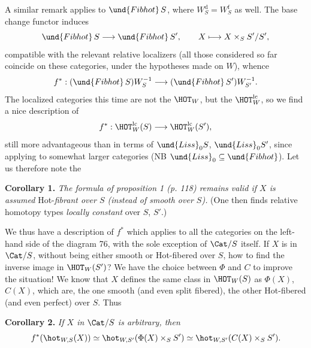 
A similar remark applies to $\und{Fibhot}\,S$, where $W_S^{\mathrm{d}} = W_S^{\mathrm{f}}$ as well. The base change functor induces
\[
\und{Fibhot}\,S \longrightarrow \und{Fibhot}\,S', \qquad X \longmapsto X \times_S S'/S',
\]
compatible with the relevant relative localizers (all those considered so far coincide on these categories, under the hypotheses made on $W$), whence
\[
f^* : (\und{Fibhot}\,S)W_S^{-1} \longrightarrow (\und{Fibhot}\,S')W_{S'}^{-1}.
\]
The localized categories this time are not the $\HOT_W$, but the $\HOT_W^{\mathrm{lc}}$, so we find a nice description of
\[
f^* : \HOT_W^{\mathrm{lc}}(S) \longrightarrow \HOT_W^{\mathrm{lc}}(S'),
\]
still more advantageous than in terms of $\und{Liss}_0S$, $\und{Liss}_0S'$, since applying to somewhat larger categories (NB $\und{Liss}_0 \subseteq \und{Fibhot}$). Let us therefore note the

\textbf{Corollary 1.} \textit{The formula of proposition 1 (p. 118) remains valid if $X$ is assumed} Hot-\textit{fibrant over $S$ (instead of smooth over $S$).} (One then finds relative homotopy types \textit{locally constant} over $S$, $S'$.)

We thus have a description of $f^*$ which applies to all the categories on the left-hand side
of the diagram 76, with the sole exception of $\Cat/S$ itself. If $X$ is in $\Cat/S$, without being either smooth or Hot-fibered over $S$, how to find the inverse image in $\HOT_W(S')$? We have the choice between $\Phi$ and $C$ to improve the situation! We know that $X$ defines the same class in $\HOT_W(S)$ as $\Phi(X)$, $C(X)$, which are, the one smooth (and even split fibered), the other Hot-fibered (and even perfect) over $S$. Thus

\textbf{Corollary 2.} \textit{If $X$ in} $\Cat/S$ \textit{is arbitrary, then}
\[
f^*(\hot_{W,S}(X)) \simeq \hot_{W,S'}(\Phi(X) \times_S S') \simeq \hot_{W,S'}(C(X) \times_S S').
\]

\bigskip

